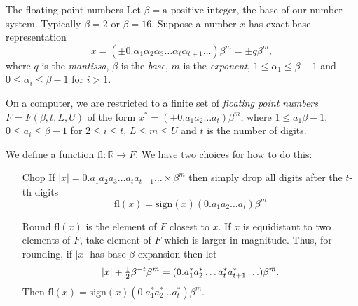 \documentclass{beamer}
\begin{document}
\begin{frame}{The floating point numbers}
Let $\beta=\text{a positive integer}$, the base of our number system. Typically $\beta=2$ or $\beta=16$.
Suppose a number $x$ has exact base representation
\begin{equation*}
x = (\pm 0.\alpha_1 \alpha_2 \alpha_3 \ldots \alpha_t \alpha_{t+1} \ldots) \beta^m = \pm q \beta^m,
\end{equation*}
where $q$ is the \emph{mantissa}, $\beta$ is the \emph{base}, $m$ is the \emph{exponent}, $1 \leq \alpha_1 \leq \beta - 1$
and $0 \leq \alpha_i \leq \beta - 1$ for $i > 1$.

On a computer, we are restricted to a finite set of \emph{floating point numbers}
$F = F(\beta, t, L, U)$ of the form $x^* = (\pm0.a_1 a_2 \ldots a_t) \beta^m$, where $1 \leq a_1 \beta-1$,
$0 \leq a_i \leq \beta - 1$ for $2 \leq i \leq t$, $L \leq m \leq U$ and $t$ is the number of digits.
\end{frame}

\def\fl{\text{fl}}

\begin{frame}
We define a function $\fl: \mathbb{R} \to F$. We have two choices for how to do this:
\begin{itemize}
\item[Chop] If $|x| = 0.a_1 a_2 a_3 \ldots a_t a_{t+1} \ldots \times \beta^m$ then simply drop all digits
after the $t$-th digits
\begin{equation*}
\fl(x) = \text{sign}(x) (0.a_1 a_2 \ldots a_t) \beta^m
\end{equation*}
\item[Round] $\fl(x)$ is the element of $F$ closest to $x$. If $x$ is equidistant to two elements
of $F$, take element of $F$ which is larger in magnitude. Thus, for rounding, if $|x|$ has base $\beta$
expansion then let
\begin{equation*}
|x| + \tfrac{1}{2} \beta^{-t} \beta^m = (0.a_1^* a_2^* \ldots a_t^* a_{t+1}^*\ldots) \beta^m.
\end{equation*}
Then $\fl(x) = \text{sign}(x) (0.a_1^* a_2^* \ldots a_t^*) \beta^m$.
\end{itemize}
\end{frame}
\end{document}
